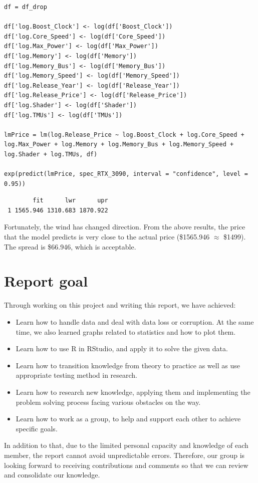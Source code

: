 \documentclass[a4paper]{article}
\begin{document}
\begin{mdframed}[leftline=false,rightline=false,backgroundcolor=lightblue!10,nobreak=false]
    \begin{verbatim}
df = df_drop

df['log.Boost_Clock'] <- log(df['Boost_Clock'])
df['log.Core_Speed'] <- log(df['Core_Speed'])
df['log.Max_Power'] <- log(df['Max_Power'])
df['log.Memory'] <- log(df['Memory'])
df['log.Memory_Bus'] <- log(df['Memory_Bus'])
df['log.Memory_Speed'] <- log(df['Memory_Speed'])
df['log.Release_Year'] <- log(df['Release_Year'])
df['log.Release_Price'] <- log(df['Release_Price'])
df['log.Shader'] <- log(df['Shader'])
df['log.TMUs'] <- log(df['TMUs'])

lmPrice = lm(log.Release_Price ~ log.Boost_Clock + log.Core_Speed + log.Max_Power + log.Memory + log.Memory_Bus + log.Memory_Speed + log.Shader + log.TMUs, df)

exp(predict(lmPrice, spec_RTX_3090, interval = "confidence", level = 0.95))
    \end{verbatim}
\end{mdframed}
\begin{lstlisting}
        fit      lwr      upr
 1 1565.946 1310.683 1870.922
\end{lstlisting}
Fortunately, the wind has changed direction. From the above results, the price that the model predicts is very close to the actual price (\$1565.946 $\approx$ \$1499). The spread is \$66.946, which is acceptable.


\section{Report goal}
Through working on this project and writing this report, we have achieved:
\begin{itemize}
    \item Learn how to handle data and deal with data loss or corruption. At the same time, we also learned graphs related to statistics and how to plot them.
    \item Learn how to use R in RStudio, and apply it to solve the given data.
    \item Learn how to transition knowledge from theory to practice as well as use appropriate testing method in research.
    \item Learn how to research new knowledge, applying them and implementing the problem solving process facing various obstacles on the way. 
    \item Learn how to work as a group, to help and support each other to achieve specific goals.
\end{itemize}
In addition to that, due to the limited personal capacity and knowledge of each member, the report cannot avoid unpredictable errors. Therefore, our group is looking forward to receiving contributions and comments so that we can review and consolidate our knowledge.
\end{document}
